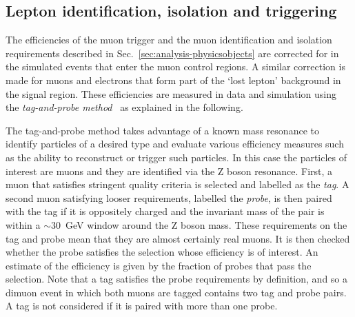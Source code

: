 

\subsection{Lepton identification, isolation and triggering}
\label{sec:analysis-mccorrections-muonsf}
The efficiencies of the muon trigger and the muon identification and isolation 
requirements 
described in Sec.~\ref{sec:analysis-physicsobjects} are corrected for in 
the simulated events that enter the muon control regions. A similar correction 
is made for muons and electrons that form part of the `lost lepton' background 
in the signal region. These efficiencies 
are measured in data and simulation using the \textit{tag-and-probe 
method}~\cite{tagnprobe} as explained in the following.

The tag-and-probe method takes advantage of a known mass resonance to identify 
particles of a desired type and evaluate various efficiency measures such as 
the ability to reconstruct or trigger such particles. In this case the 
particles of interest are muons and they are identified via the Z boson 
resonance. 
First, a muon that satisfies stringent quality criteria is selected and 
labelled as the \textit{tag}. A second muon satisfying looser requirements, 
labelled the \textit{probe}, is then paired with the tag if it is oppositely 
charged and the invariant mass of the pair is within a $\sim$30~GeV window 
around the Z boson mass. These requirements on the tag and probe mean that they 
are almost certainly real muons. It is then checked whether the probe satisfies 
the selection whose efficiency is of interest. An estimate of the efficiency is 
given by the fraction of probes that pass the selection. Note that a tag 
satisfies the probe requirements by definition, and so a dimuon event in which 
both muons are tagged contains two tag and probe pairs. A tag is not considered 
if it is paired with more than one probe.

